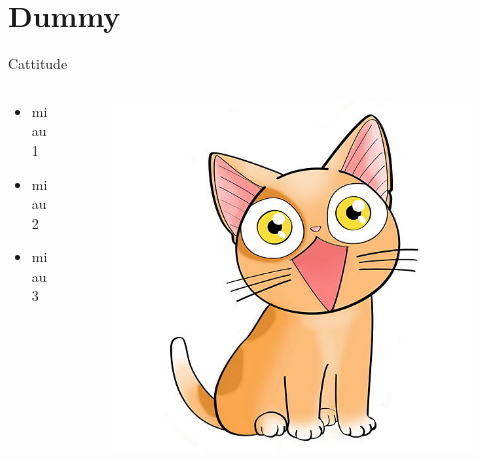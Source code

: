 \section{Dummy}

\begin{frame}{Cattitude}
	\begin{columns}
		\begin{column}[l]{0.2\textwidth}
		\begin{itemize}
			\item miau1
			\item miau2
			\item miau3
		\end{itemize}

		\end{column}
		\begin{column}[l]{0.8\textwidth}
			\begin{figure}
				\includegraphics[scale=1.5]{img/cat.jpg}
			\end{figure}
		\end{column}
	\end{columns}
\end{frame}
